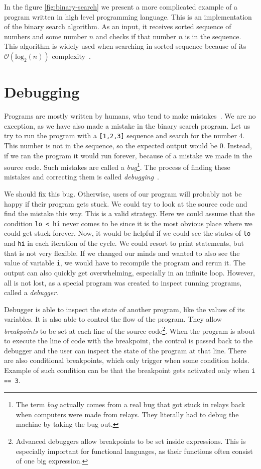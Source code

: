 In the figure \ref{fig:binary-search} we present a more complicated example of
a program written in high level programming language. This is an implementation
of the binary search algorithm. As an input, it receives sorted sequence of
numbers and some number $n$ and checks if that number $n$ is in the sequence.
This algorithm is widely used when searching in sorted sequence because of its
$\mathcal{O}(\text{log}_2(n))$ complexity~\cite{pruvodce}.

\section{Debugging}
Programs are mostly written by humans, who tend to make
mistakes~\cite{human-error}. We are no exception, as we have also made a
mistake in the binary search program. Let us try to run the program with a
\texttt{[1,2,3]} sequence and search for the number $4$. This number is not in
the sequence, so the expected output would be $0$. Instead, if we ran the
program it would run forever, because of a mistake we made in the source code.
Such mistakes are called a \textit{bug}\footnote{The term \textit{bug}
actually comes from a real bug that got stuck in relays back when computers
were made from relays. They literally had to debug the machine by taking the
bug out.}. The process of finding these mistakes and correcting them is called
\textit{debugging}~\cite{art-of-testing}.

We should fix this bug. Otherwise, users of our program will probably not be
happy if their program gets stuck. We could try to look at the source code and
find the mistake this way. This is a valid strategy. Here we could assume that
the condition \texttt{lo < hi} never comes to be since it is the most obvious
place where we could get stuck forever. Now, it would be helpful if we could
see the states of \texttt{lo} and \texttt{hi} in each iteration of the cycle.
We could resort to print statements, but that is not very flexible. If we
changed our minds and wanted to also see the value of variable \texttt{i}, we
would have to recompile the program and rerun it. The output can also quickly
get overwhelming, especially in an infinite loop. However, all is not lost, as
a special program was created to inspect running programs, called a
\textit{debugger}.

Debugger is able to inspect the state of another program, like the values of
its variables. It is also able to control the flow of the program. They allow
\textit{breakpoints} to be set at each line of the source
code\footnote{Advanced debuggers allow breakpoints to be set inside
expressions. This is especially important for functional languages, as their
functions often consist of one big expression.}. When the program is about to
execute the line of code with the breakpoint, the control is passed back to the
debugger and the user can inspect the state of the program at that line. There
are also conditional breakpoints, which only trigger when some condition holds.
Example of such condition can be that the breakpoint gets activated only when
\texttt{i == 3}.

